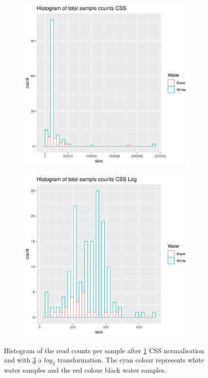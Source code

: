\begin{figure}[h]
	\centering
	\begin{subfigure}{0.4\textwidth}
		\centering
		\includegraphics[width = \textwidth]{histogramofcountdatacss}
		\caption{}
		\label{fig:histcss}
	\end{subfigure}
	\begin{subfigure}{0.4\textwidth}
	\centering
	\includegraphics[width = \textwidth]{histogramofcountdatacsslog}
	\caption{}
	\label{fig:histcsslog}
	\end{subfigure}
	\caption{Histogram of the read counts per sample after \ref{fig:histcss} CSS normalisation and with \ref{fig:histcsslog} a $log_2$ transformation. The cyan colour represents white water samples and the red colour black water samples. }
\end{figure}


